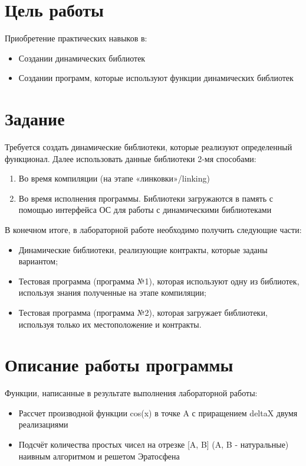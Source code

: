 \documentclass[a4paper, 12pt]{article}
\begin{document}
\section{Цель работы}
Приобретение практических навыков в:
\begin{itemize}
  \item Создании динамических библиотек
  \item Создании программ, которые используют функции динамических библиотек
\end{itemize}

\section{Задание}
Требуется создать динамические библиотеки, которые реализуют определенный функционал. Далее использовать данные библиотеки 2-мя способами:
\begin{enumerate}
  \item Во время компиляции (на этапе «линковки»/linking)
  \item Во время исполнения программы. Библиотеки загружаются в память с помощью интерфейса ОС для работы с динамическими библиотеками
\end{enumerate}
В конечном итоге, в лабораторной работе необходимо получить следующие части:
\begin{itemize}
  \item Динамические библиотеки, реализующие контракты, которые заданы вариантом;
  \item Тестовая программа (программа №1), которая используют одну из библиотек, используя знания полученные на этапе компиляции;
  \item Тестовая программа (программа №2), которая загружает библиотеки, используя только их местоположение и контракты.
\end{itemize}

\section{Описание работы программы}
Функции, написанные в результате выполнения лабораторной работы:
\begin{itemize}
  \item Рассчет производной функции cos(x) в точке A с приращением deltaX двумя реализациями
  \item Подсчёт количества простых чисел на отрезке [A, B] (A, B - натуральные) наивным алгоритмом и решетом Эратосфена
\end{itemize}
\end{document}
